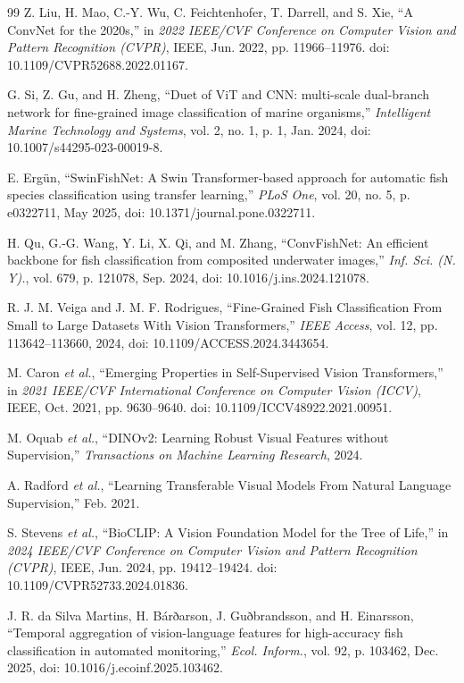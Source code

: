 \documentclass[preprint,12pt]{elsarticle}
\begin{document}
\begin{thebibliography}{99}
 Z. Liu, H. Mao, C.-Y. Wu, C. Feichtenhofer, T. Darrell, and S.
Xie, ``A ConvNet for the 2020s,'' in \emph{2022 IEEE/CVF Conference on
Computer Vision and Pattern Recognition (CVPR)}, IEEE, Jun. 2022, pp.
11966--11976. doi: 10.1109/CVPR52688.2022.01167.

 G. Si, Z. Gu, and H. Zheng, ``Duet of ViT and CNN: multi-scale
dual-branch network for fine-grained image classification of marine
organisms,'' \emph{Intelligent Marine Technology and Systems}, vol. 2,
no. 1, p. 1, Jan. 2024, doi: 10.1007/s44295-023-00019-8.

 E. Ergün, ``SwinFishNet: A Swin Transformer-based approach for
automatic fish species classification using transfer learning,''
\emph{PLoS One}, vol. 20, no. 5, p. e0322711, May 2025, doi:
10.1371/journal.pone.0322711.

 H. Qu, G.-G. Wang, Y. Li, X. Qi, and M. Zhang, ``ConvFishNet:
An efficient backbone for fish classification from composited underwater
images,'' \emph{Inf. Sci. (N. Y).}, vol. 679, p. 121078, Sep. 2024, doi:
10.1016/j.ins.2024.121078.

 R. J. M. Veiga and J. M. F. Rodrigues, ``Fine-Grained Fish
Classification From Small to Large Datasets With Vision Transformers,''
\emph{IEEE Access}, vol. 12, pp. 113642--113660, 2024, doi:
10.1109/ACCESS.2024.3443654.

 M. Caron \emph{et al.}, ``Emerging Properties in
Self-Supervised Vision Transformers,'' in \emph{2021 IEEE/CVF
International Conference on Computer Vision (ICCV)}, IEEE, Oct. 2021,
pp. 9630--9640. doi: 10.1109/ICCV48922.2021.00951.

 M. Oquab \emph{et al.}, ``DINOv2: Learning Robust Visual
Features without Supervision,'' \emph{Transactions on Machine Learning
Research}, 2024.

 A. Radford \emph{et al.}, ``Learning Transferable Visual Models
From Natural Language Supervision,'' Feb. 2021.

 S. Stevens \emph{et al.}, ``BioCLIP: A Vision Foundation Model
for the Tree of Life,'' in \emph{2024 IEEE/CVF Conference on Computer
Vision and Pattern Recognition (CVPR)}, IEEE, Jun. 2024, pp.
19412--19424. doi: 10.1109/CVPR52733.2024.01836.

 J. R. da Silva Martins, H. Bárðarson, J. Guðbrandsson, and H.
Einarsson, ``Temporal aggregation of vision-language features for
high-accuracy fish classification in automated monitoring,'' \emph{Ecol.
Inform.}, vol. 92, p. 103462, Dec. 2025, doi:
10.1016/j.ecoinf.2025.103462.


\end{thebibliography}
\end{document}
